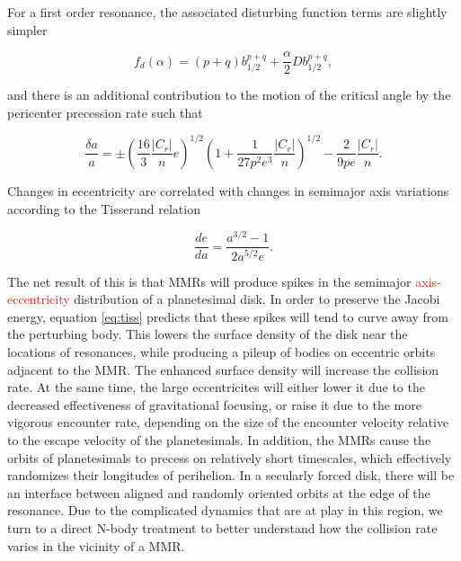 \documentclass[twocolumn]{aastex63}
\newcommand{\ACBc}[1]{\textcolor{red}{#1}}
\begin{document}
For a first order resonance, the associated disturbing function terms are slightly simpler

\begin{equation}\label{eq:fd_fo}
	f_{d}(\alpha) = (p+q) b_{1/2}^{p+q} + \frac{\alpha}{2} D b_{1/2}^{p+q},
\end{equation}

\noindent and there is an additional contribution to the motion of the critical angle by the pericenter precession rate such that

\begin{equation}\label{eq:res_fo}
	\frac{\delta a}{a} = \pm \left(\frac{16}{3} \frac{\left| C_{r} \right|}{n} e \right)^{1/2} \left(  1 + \frac{1}{27 p^2 e^3} \frac{\left| C_{r} \right|}{n} 
	\right)^{1/2} - \frac{2}{9 p e}  \frac{\left| C_{r} \right|}{n}.
\end{equation}

Changes in eccentricity are correlated with changes in semimajor axis variations according to the Tisserand relation

\begin{equation}\label{eq:tiss}
	\frac{de}{da} = \frac{a^{3/2} - 1}{2 a^{5/2} e}.
\end{equation}

The net result of this is that MMRs will produce spikes in the semimajor \ACBc{axis-eccentricity} distribution of a planetesimal disk. In order to 
preserve the Jacobi energy, equation \ref{eq:tiss} predicts that these spikes will tend to curve away from the perturbing body. This lowers the 
surface density of the disk near the locations of resonances, while producing a pileup of bodies on eccentric orbits adjacent to the MMR. The 
enhanced surface density will increase the collision rate. At the same time, the large eccentricites will either lower it due to the decreased 
effectiveness of gravitational focusing, or raise it due to the more vigorous encounter rate, depending on the size of the encounter velocity relative to 
the escape velocity of the planetesimals. In addition, the MMRs cause the orbits of planetesimals to precess on relatively short 
timescales, which effectively randomizes their longitudes of perihelion. In a secularly forced disk, there will be an interface between aligned 
and randomly oriented orbits at the edge of the resonance. Due to the complicated dynamics that are at play in this region, we turn to a direct 
N-body treatment to better understand how the collision rate varies in the vicinity of a MMR.
\end{document}
